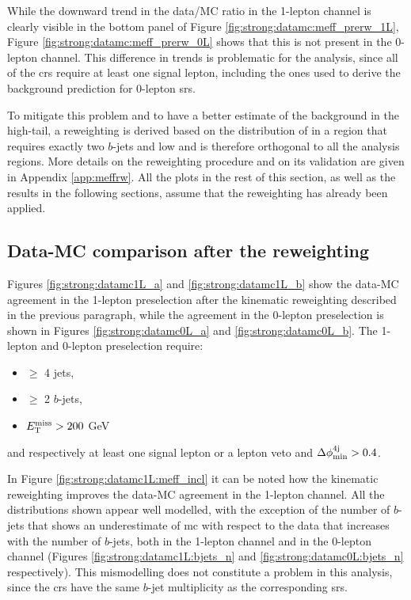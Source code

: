 While the downward trend in the data/MC ratio in the 1-lepton channel is clearly visible in the bottom panel of Figure \ref{fig:strong:datamc:meff_prerw_1L},
Figure \ref{fig:strong:datamc:meff_prerw_0L} shows that this is not present in the 0-lepton channel.
This difference in trends is problematic for the analysis, since all of the \glspl{cr} require at least one signal lepton, 
including the ones used to derive the background prediction for 0-lepton \glspl{sr}. 

To mitigate this problem and to have a better estimate of the background in the high-\meff tail, a reweighting is derived 
based on the distribution of \meff in a region that requires exactly two $b$-jets and low \mtb and is therefore
 orthogonal to all the analysis regions. More details on the reweighting procedure and on its validation are given in Appendix \ref{app:meffrw}.
All the plots in the rest of this section, as well as the results in the following sections, 
assume that the reweighting has already been applied. 


\subsection{Data-MC comparison after the reweighting}

Figures \ref{fig:strong:datamc1L_a} and \ref{fig:strong:datamc1L_b} show the data-MC agreement in the 1-lepton preselection after the 
kinematic reweighting described in the previous paragraph, while 
the agreement in the 0-lepton preselection is shown in Figures \ref{fig:strong:datamc0L_a} and \ref{fig:strong:datamc0L_b}.
The 1-lepton and 0-lepton preselection require:
\begin{itemize}
\item $\geq$ 4 jets,
\item $\geq$ 2 $b$-jets,
\item $E_{\rm T}^{\mathrm{miss}} > 200$ GeV
\end{itemize}
and respectively at least one signal lepton or a lepton veto and $\Delta\phi_{\rm{min}}^{4{\rm{j}}} > 0.4$.

In Figure \ref{fig:strong:datamc1L:meff_incl} it can be noted how the kinematic reweighting improves the data-MC agreement in
the 1-lepton channel. 
All the distributions shown appear well modelled, with the exception of the number of $b$-jets 
that shows an underestimate of \gls{mc} with respect to the data that increases with the number of $b$-jets, both in 
the 1-lepton channel and in the 0-lepton channel 
(Figures \ref{fig:strong:datamc1L:bjets_n} and \ref{fig:strong:datamc0L:bjets_n} respectively).
This mismodelling does not constitute a problem in this analysis, 
since the \glspl{cr} have the same $b$-jet multiplicity as the corresponding \glspl{sr}.



